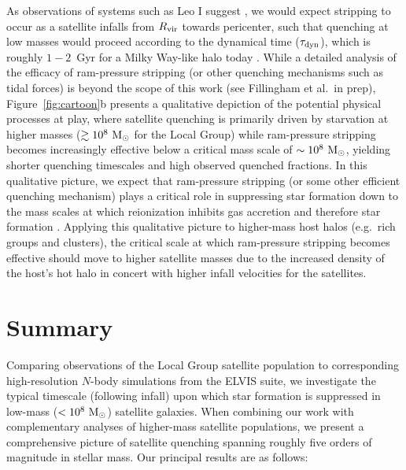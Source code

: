 As observations of systems such as Leo I suggest \citep{sohn13}, we
would expect stripping to occur as a satellite infalls from $R_{\rm
  vir}$ towards pericenter, such that quenching at low masses would
proceed according to the dynamical time ($\tau_{\rm dyn}$), which is
roughly $1-2$~Gyr for a Milky Way-like halo today
\citep[e.g.][]{stewart09}.
%
While a detailed analysis of the efficacy of ram-pressure stripping
(or other quenching mechanisms such as tidal forces) is beyond the
scope of this work (see Fillingham et al.~in prep),
Figure~\ref{fig:cartoon}b presents a qualitative depiction of the
potential physical processes at play, where satellite quenching is
primarily driven by starvation at higher masses ($\gtrsim
10^{8}~{\rm M}_{\odot}$ for the Local Group) while ram-pressure stripping
becomes increasingly effective below a critical mass scale of $\sim
10^{8}~{\rm M}_{\odot}$, yielding shorter quenching timescales and high observed
quenched fractions. In this qualitative picture, we expect that
ram-pressure stripping (or some other efficient quenching mechanism)
plays a critical role in suppressing star formation down to the mass
scales at which reionization inhibits gas accretion and therefore star
formation \citep[perhaps, $\mstar \sim 10^{4}~\msun$,][]{brown14,
  onorbe15, wheeler15}. Applying this qualitative picture to
higher-mass host halos (e.g.~rich groups and clusters), the critical
scale at which ram-pressure stripping becomes effective should move to
higher satellite masses due to the increased density of the host's hot
halo in concert with higher infall velocities for the satellites.




\section{Summary}
\label{sec:summary}

Comparing observations of the Local Group satellite population to
corresponding high-resolution $N$-body simulations from the ELVIS
suite, we investigate the typical timescale (following infall) upon
which star formation is suppressed in low-mass ($<10^{8}~{\rm M}_{\odot}$)
satellite galaxies. When combining our work with complementary
analyses of higher-mass satellite populations, we present a
comprehensive picture of satellite quenching spanning roughly five
orders of magnitude in stellar mass. Our principal results are as
follows:

